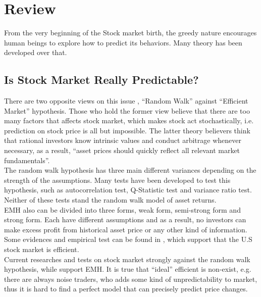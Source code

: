 \chapter{Review}
\label{ch:review}

From the very beginning of the Stock market birth, the greedy nature encourages human beings to explore how to predict its behaviors. Many theory has been developed over that.

\section{Is Stock Market Really Predictable?}
There are two opposite views on this issue \cite{2_dalton_2001}, “Random Walk” against “Efficient Market” hypothesis. Those who hold the former view believe that there are too many factors that affects stock market, which makes stock act stochastically, i.e. prediction on stock price is all but impossible. The latter theory believers think that rational investors know intrinsic values and conduct arbitrage whenever necessary, as a result, “asset prices should quickly reflect all relevant market fundamentals”\cite{1_wong_1997}.\\

The random walk hypothesis has three main different variances depending on the strength of the assumptions\cite{1_shadbolttaylor_2002}. Many tests have been developed to test this hypothesis, such as autocorrelation test\cite{lo1988stock}, Q-Statistic test\cite{box1970distribution} and variance ratio test\cite{1_shadbolttaylor_2002}. Neither of these tests stand the random walk model of asset returns.\\

EMH also can be divided into three forms\cite{1_wong_1997}, weak form, semi-strong form and strong form. Each have different assumptions and as a result, no investors can make excess profit from historical asset price or any other kind of information. Some evidences and empirical test can be found in \cite{1_keane_1983}, which support that the U.S stock market is efficient.\\

Current researches and tests on stock market strongly against the random walk hypothesis, while support EMH. It is true that “ideal” efficient is non-exist, e.g. there are always noise traders\cite{de1990noise}, who adds some kind of unpredictability to market, thus it is hard to find a perfect model that can precisely predict price changes.

